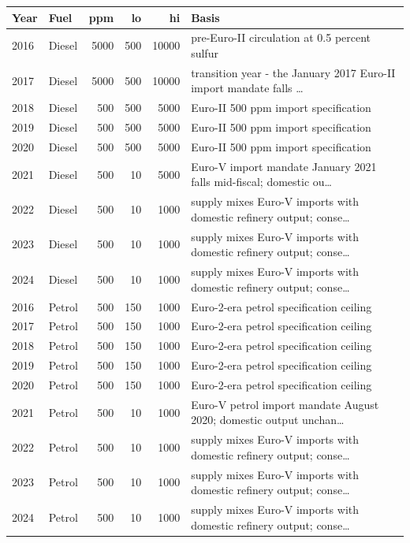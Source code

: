\begin{table}[!htbp]
\centering
\scriptsize
\begin{tabular}{@{}llrrrl@{}}
\toprule
\textbf{Year} & \textbf{Fuel} & \textbf{ppm} & \textbf{lo} & \textbf{hi} & \textbf{Basis} \\
\midrule
2016 & Diesel & 5000 & 500 & 10000 & pre-Euro-II circulation at 0.5 percent sulfur \\
2017 & Diesel & 5000 & 500 & 10000 & transition year - the January 2017 Euro-II import mandate falls \dots \\
2018 & Diesel & 500 & 500 & 5000 & Euro-II 500 ppm import specification \\
2019 & Diesel & 500 & 500 & 5000 & Euro-II 500 ppm import specification \\
2020 & Diesel & 500 & 500 & 5000 & Euro-II 500 ppm import specification \\
2021 & Diesel & 500 & 10 & 5000 & Euro-V import mandate January 2021 falls mid-fiscal; domestic ou\dots \\
2022 & Diesel & 500 & 10 & 1000 & supply mixes Euro-V imports with domestic refinery output; conse\dots \\
2023 & Diesel & 500 & 10 & 1000 & supply mixes Euro-V imports with domestic refinery output; conse\dots \\
2024 & Diesel & 500 & 10 & 1000 & supply mixes Euro-V imports with domestic refinery output; conse\dots \\
2016 & Petrol & 500 & 150 & 1000 & Euro-2-era petrol specification ceiling \\
2017 & Petrol & 500 & 150 & 1000 & Euro-2-era petrol specification ceiling \\
2018 & Petrol & 500 & 150 & 1000 & Euro-2-era petrol specification ceiling \\
2019 & Petrol & 500 & 150 & 1000 & Euro-2-era petrol specification ceiling \\
2020 & Petrol & 500 & 150 & 1000 & Euro-2-era petrol specification ceiling \\
2021 & Petrol & 500 & 10 & 1000 & Euro-V petrol import mandate August 2020; domestic output unchan\dots \\
2022 & Petrol & 500 & 10 & 1000 & supply mixes Euro-V imports with domestic refinery output; conse\dots \\
2023 & Petrol & 500 & 10 & 1000 & supply mixes Euro-V imports with domestic refinery output; conse\dots \\
2024 & Petrol & 500 & 10 & 1000 & supply mixes Euro-V imports with domestic refinery output; conse\dots \\

\end{tabular}
\end{table}
